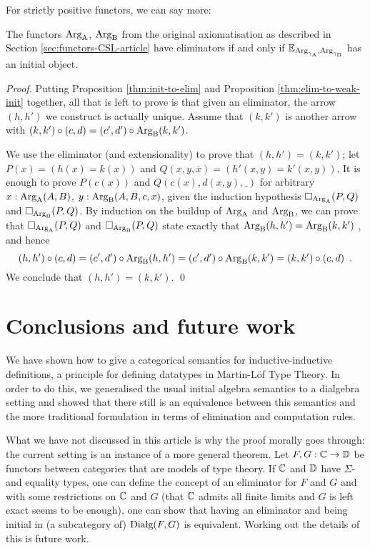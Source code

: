 \documentclass[orivec,envcountsame, ,envcountsect]{llncs}
\begin{document}
For strictly positive functors, we can say more:

\label{sec:elim-init-equiv-CSL}
\begin{theorem}
\label{thm:equiv-init-elim}
The functors $\text{Arg}_{\text{A}}$, $\text{Arg}_{\text{B}}$ from the original axiomatisation as
described in Section \ref{sec:functors-CSL-article} have eliminators
if and only if $\mathbb{E}_{\text{Arg}_{\gamma_\text{A}}, \text{Arg}_{\gamma_\text{B}}}$ has an initial object.
\end{theorem}
\begin{proof}
Putting Proposition
  \ref{thm:init-to-elim} and Proposition \ref{thm:elim-to-weak-init}
  together, all that is left to prove is that given an eliminator, the
  arrow $(h, h')$ we construct is actually unique. Assume that $(k,
  k')$ is another arrow with $(k, k') \circ (c, d) = (c', d') \circ
  \text{Arg}_{\text{B}}(k, k')$.

  We use the eliminator (and extensionality) to prove that $(h, h') =
  (k ,k')$; let $P(x) = (h(x) = k(x))$ and $Q(x, y, \overline{x})
  = (h'(x, y) = k'(x, y))$. It is enough to prove $P(c(x))$ and
  $Q(c(x), d(x, y), \_)$ for arbitrary $x : \text{Arg}_{\text{A}}(A, B)$, $y :
  \text{Arg}_{\text{B}}(A, B, c, x)$, given the induction hypothesis $\Box_{\text{Arg}_{\text{A}}}(P,
  Q)$ and $\Box_{\text{Arg}_{\text{B}}}(P, Q)$.
By induction on the buildup of $\text{Arg}_{\text{A}}$ and $\text{Arg}_{\text{B}}$, we can prove that 
$\Box_{\text{Arg}_{\text{A}}}(P,  Q)$ and $\Box_{\text{Arg}_{\text{B}}}(P, Q)$ state exactly that
$\text{Arg}_{\text{B}}(h, h') =  \text{Arg}_{\text{B}}(k, k')$ , and hence
  \[
  (h, h') \circ (c, d) = (c', d') \circ \text{Arg}_{\text{B}}(h, h')
                       = (c', d') \circ \text{Arg}_{\text{B}}(k, k')
                       = (k, k') \circ (c, d) \enspace .
  \]
  We conclude that $(h, h') =  (k ,k')$. \qed
\end{proof}
\section{Conclusions and future work}

We have shown how to give a categorical semantics for
inductive-inductive definitions, a principle for defining datatypes in
Martin-L\"of Type Theory. In order to do this, we generalised the
usual initial algebra semantics to a dialgebra setting and showed that
there still is an equivalence between this semantics and the more
traditional formulation in terms of elimination and computation rules.

What we have not discussed in this article is why the proof morally
goes through: the current setting is an instance of a more general
theorem. Let $F, G: \mathbb{C} \to \mathbb{D}$ be functors between categories that are
models of type theory. If $\mathbb{C}$ and $\mathbb{D}$ have $\Sigma$- and equality
types, one can define the concept of an eliminator for $F$ and $G$ and
with some restrictions on $\mathbb{C}$ and $G$ (that $\mathbb{C}$ admits all finite
limits and $G$ is left exact seems to be enough), one can show that
having an eliminator and being initial in (a subcategory of)
$\text{Dialg}(F, G)$ is equivalent. Working out the details of this is
future work.
\end{document}
